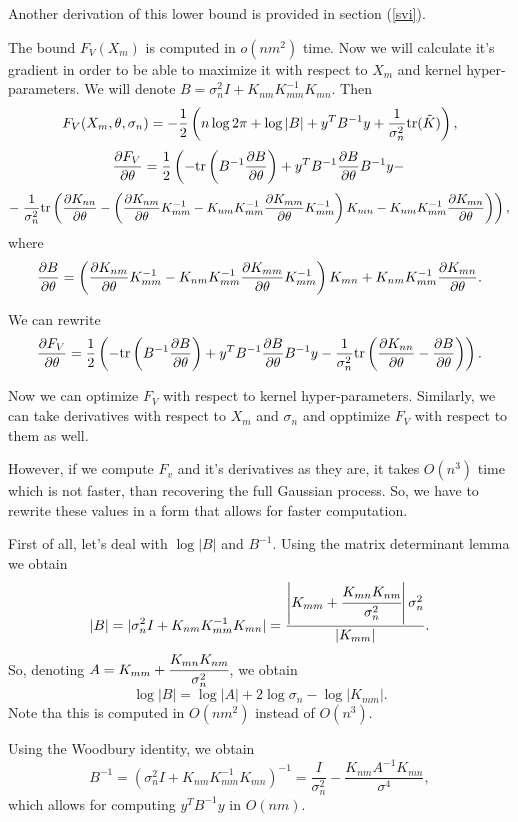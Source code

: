\documentclass[12pt]{article}
\begin{document}
		Another derivation of this lower bound is provided in section (\ref{svi}).

		The bound $F_V(X_m)$ is computed in $o(nm^2)$ time. Now we will calculate it's gradient in order to be able to maximize it with respect to $X_m$ and kernel hyper-parameters. We will denote $B = \sigma_n^2 I + K_{nm} K_{mm}^{-1} K_{mn}$. Then
		$$F_V(X_m, \theta, \sigma_n) = -\frac 1 2 \left(n \log 2\pi + \log |B| + y^T B^{-1} y + \frac 1 {\sigma_n^2} \mbox{tr}(\tilde K)\right),$$
		$$\frac{\partial F_V}{\partial \theta} = \frac 1 2 \left( -\mbox{tr} \left(B^{-1} \frac{\partial B}{\partial \theta}\right) + y^T B^{-1} \frac{\partial B}{\partial \theta} B^{-1} y - \right.$$    
		$$- \left. \frac 1 {\sigma_n^2} \mbox{tr}\left(\frac{\partial K_{nn}}{\partial \theta} - \left(\frac{\partial K_{nm}}{\partial \theta}K_{mm}^{-1} - K_{nm} K_{mm}^{-1} \frac{\partial K_{mm}}{\partial \theta}K_{mm}^{-1}\right) K_{mn} - K_{nm} K_{mm}^{-1} \frac{\partial K_{mn}}{\partial \theta}\right)\right),$$
		where
		$$\frac{\partial B}{\partial \theta} = \left(\frac{\partial K_{nm}}{\partial \theta}K_{mm}^{-1} - K_{nm} K_{mm}^{-1} \frac{\partial K_{mm}}{\partial \theta}K_{mm}^{-1}\right) K_{mn} +  K_{nm} K_{mm}^{-1} \frac{\partial K_{mn}}{\partial \theta}.$$

		We can rewrite
		$$\frac{\partial F_V}{\partial \theta} = \frac 1 2 \left( -\mbox{tr} \left(B^{-1} \frac{\partial B}{\partial \theta}\right) + y^T B^{-1} \frac{\partial B}{\partial \theta} B^{-1} y - \frac 1 {\sigma_n^2} \mbox{tr} \left(\frac{\partial K_{nn}}{\partial \theta} - \frac{\partial B}{\partial \theta}\right) \right).$$

		Now we can optimize $F_V$ with respect to kernel hyper-parameters. Similarly, we can take derivatives with respect to $X_m$ and $\sigma_n$ and opptimize $F_V$ with respect to them as well.

		However, if we compute $F_v$ and it's derivatives as they are, it takes $O(n^3)$ time which is not faster, than recovering the full Gaussian process. So, we have to rewrite these values in a form that allows for faster computation.

		First of all, let's deal with $\log|B|$ and $B^{-1}$. Using the matrix determinant lemma we obtain
		$$|B| = |\sigma_n^2 I + K_{nm} K_{mm}^{-1} K_{mn}| = \frac{\left|K_{mm} + \cfrac{K_{mn} K_{nm}}{\sigma_n^2}\right| \sigma_n^2}{|K_{mm}|}.$$
		So, denoting $A = K_{mm} + \cfrac{K_{mn} K_{nm}}{\sigma_n^2}$, we obtain
		$$\log |B| = \log |A| + 2 \log \sigma_n - \log |K_{mm}|.$$
		Note tha this is computed in $O(n m^2)$ instead of $O(n^3)$.

		Using the Woodbury identity, we obtain
		$$B^{-1} = (\sigma_n^2 I + K_{nm} K_{mm}^{-1} K_{mn})^{-1} = \frac I {\sigma_n^2} - \frac{K_{nm} A^{-1} K_{mn}}{\sigma^{4}},$$
		which allows for computing $y^T B^{-1} y$ in $O(n m)$.
\end{document}
